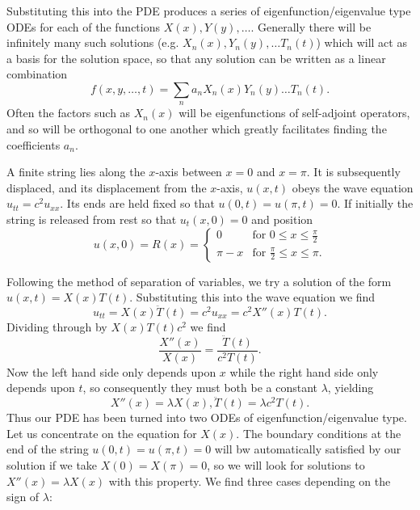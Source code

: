 \documentclass[10pt, a4paper]{article}
\begin{document}
Substituting this into the PDE produces a series of eigenfunction/eigenvalue type ODEs for each of the functions $X(x), Y(y), \dotsc$.
Generally there will be infinitely many such solutions
(e.g. $X_n(x), Y_n(y), \dotsc T_n(t)$)
which will act as a basis for the solution space,
so that any solution can be written as a linear combination
\[
f(x, y, \dotsc, t) = \sum_{n}a_nX_n(x)Y_n(y)\dotsc T_n(t).
\]
Often the factors such as $X_n(x)$ will be eigenfunctions of self-adjoint operators,
and so will be orthogonal to one another which greatly facilitates finding the coefficients $a_n$.

\begin{example}
    A finite string lies along the $x$-axis between $x = 0$ and $x = \pi$.
    It is subsequently displaced,
    and its displacement from the $x$-axis,
    $u(x, t)$ obeys the wave equation $u_{tt} = c ^ 2u_{xx}$.
    Its ends are held fixed so that $u(0, t) = u(\pi, t) = 0$.
    If initially the string is released from rest so that $u_t(x, 0) = 0$ and position
    \[
    u(x, 0) = R(x) = \begin{cases}
        0 &\text{for } 0 \leq x \leq \frac{\pi}{2} \\
        \pi - x &\text{for } \frac{\pi}{2} \leq x \leq \pi.
    \end{cases}
    \]

    \begin{solution}
        Following the method of separation of variables,
        we try a solution of the form $u(x, t) = X(x)T(t)$.
        Substituting this into the wave equation we find
        \[
        u_{tt} = X(x)\ddot{T}(t) = c ^ 2u_{xx} = c ^ 2X''(x)T(t).
        \]
        Dividing through by $X(x)T(t)c ^ 2$ we find
        \[
        \frac{X''(x)}{X(x)} = \frac{\ddot{T}(t)}{c ^ 2T(t)}.
        \]
        Now the left hand side only depends upon $x$ while the right hand side only depends upon $t$,
        so consequently they must both be a constant $\lambda$,
        yielding
        \[
        X''(x) = \lambda X(x), \ddot{T}(t) = \lambda c ^ 2T(t).
        \]
        Thus our PDE has been turned into two ODEs of eigenfunction/eigenvalue type.
        Let us concentrate on the equation for $X(x)$.
        The boundary conditions at the end of the string $u(0, t) = u(\pi, t) = 0$ will bw automatically satisfied by our solution if we take $X(0) = X(\pi) = 0$,
        so we will look for solutions to $X''(x) = \lambda X(x)$ with this property.
        We find three cases depending on the sign of $\lambda$:


\end{solution}
\end{example}
\end{document}
